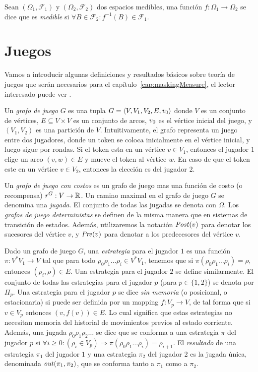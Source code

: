 Sean $(\Omega_1,\mathcal{F}_1)$ y $(\Omega_2,\mathcal{F}_2)$ dos espacios medibles, una función $f:\Omega_1 \rightarrow \Omega_2$ se dice que es \emph{medible} si $\forall B \in \mathcal{F}_2 : f^{-1}(B) \in \mathcal{F}_1$.

\section{Juegos}

Vamos a introducir algunas definiciones y resultados básicos sobre teoría de juegos que serán necesarios para el capítulo~\ref{cap:maskingMeasure}, el lector interesado puede ver \cite{AptG11}.

Un \emph{grafo de juego} $G$ es una tupla $G = \langle V, V_1, V_2, E, v_0 \rangle$ donde $V$ es un conjunto de vértices, $E\subseteq V \times V$ es un conjunto de arcos, $v_0$ es el vértice inicial del juego, y $(V_1, V_2)$ es una partición de $V$. Intuitivamente, el grafo representa un juego entre dos jugadores, donde un token se coloca inicialmente en el vértice inicial, y luego sigue por rondas. Si el token esta en un vértice $v \in V_1$, entonces el jugador $1$ elige un arco $(v, w) \in E$ y mueve el token al vértice $w$. En caso de que el token este en un vértice $v \in V_2$, entonces la elección es del jugador $2$.

Un \emph{grafo de juego con costos} es un grafo de juego mas una función de costo (o recompensa) $\mathit{r}^G:V \rightarrow \mathbb{R}$. Un camino maximal en el grafo de juego $G$ se denomina una \emph{jugada}. El conjunto de todas las jugadas se denota con $\Omega$. Los \emph{grafos de juego deterministas} se definen de la misma manera que en sistemas de transición de estados. Además, utilizaremos la notación $\mathit{Post}(v)$ para denotar los sucesores del vértice $v$, y $\mathit{Pre}(v)$ para denotar a los predecesores del vértice $v$.

Dado un grafo de juego $G$, una \emph{estrategia} para el jugador $1$ es una función $\pi: V^{*} V_1 \rightarrow V$ tal que para todo  $\rho_0  \rho_1 \dots \rho_i \in V^{*} V_1$, tenemos que si $\pi(\rho_0  \rho_1\dots \rho_i) = \rho $, entonces $(\rho_i, \rho) \in E$. Una estrategia para el jugador $2$ se define similarmente. El conjunto de todas las estrategias para el jugador $p$ (para $p \in \{1,2\}$) se denota por $\Pi_{p}$.
Una estrategia para el jugador $p$ se dice \emph{sin memoria} (o posicional, o estacionaria) si puede ser definida por un mapping $f:V_p \rightarrow V$, de tal forma que si $v \in V_p$ entonces $(v, f(v)) \in E$.
Lo cual significa que estas estrategias no necesitan memoria del historial de movimientos previos al estado corriente. Además, una jugada $\rho_0 \rho_1 \rho_2 \dots$ se dice que se conforma a una estrategia $\pi$ del jugador $p$ si $\forall i \geq 0: (\rho_i \in V_p) \Rightarrow  \pi(\rho_0 \rho_1 \dots \rho_i) = \rho_{i+1}$. El \emph{resultado} de una estrategia $\pi_{1}$ del jugador $1$ y una estrategia $\pi_{2}$ del jugador $2$ es la jugada única, denominada $\mathit{out}(\pi_1, \pi_2)$, que se conforma tanto a $\pi_1$ como a $\pi_2$.


